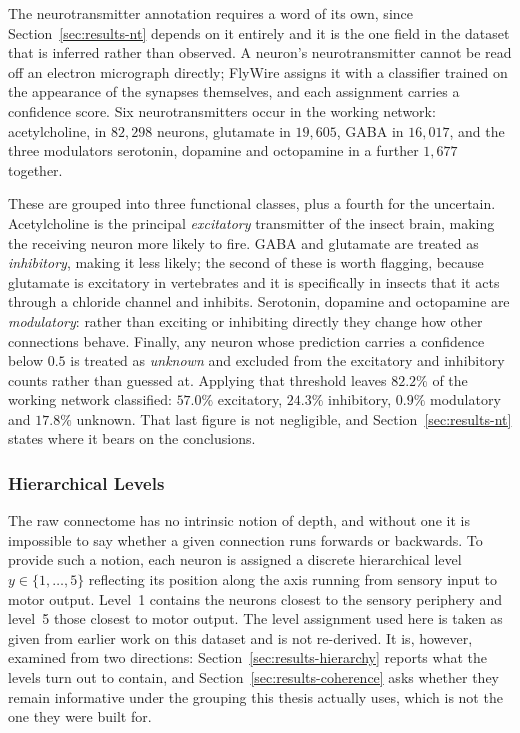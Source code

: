 \documentclass[12pt,a4paper,oneside]{article}
\theoremstyle{definition}
\theoremstyle{plain}
\begin{document}
The neurotransmitter annotation requires a word of its own, since
Section~\ref{sec:results-nt} depends on it entirely and it is the one field
in the dataset that is inferred rather than observed. A neuron's
neurotransmitter cannot be read off an electron micrograph directly; FlyWire
assigns it with a classifier trained on the appearance of the synapses
themselves, and each assignment carries a confidence score. Six
neurotransmitters occur in the working network: acetylcholine, in $82{,}298$
neurons, glutamate in $19{,}605$, GABA in $16{,}017$, and the three
modulators serotonin, dopamine and octopamine in a further $1{,}677$
together.

These are grouped into three functional classes, plus a fourth for the
uncertain. Acetylcholine is the principal \emph{excitatory} transmitter of
the insect brain, making the receiving neuron more likely to fire. GABA and
glutamate are treated as \emph{inhibitory}, making it less likely; the
second of these is worth flagging, because glutamate is excitatory in
vertebrates and it is specifically in insects that it acts through a
chloride channel and inhibits. Serotonin, dopamine and octopamine are
\emph{modulatory}: rather than exciting or inhibiting directly they change
how other connections behave. Finally, any neuron whose prediction carries a
confidence below $0.5$ is treated as \emph{unknown} and excluded from the
excitatory and inhibitory counts rather than guessed at. Applying that
threshold leaves $82.2\%$ of the working network classified: $57.0\%$
excitatory, $24.3\%$ inhibitory, $0.9\%$ modulatory and $17.8\%$ unknown.
That last figure is not negligible, and Section~\ref{sec:results-nt} states
where it bears on the conclusions.

\subsubsection{Hierarchical Levels}
\label{sec:levels}

The raw connectome has no intrinsic notion of depth, and without one it is
impossible to say whether a given connection runs forwards or backwards.
To provide such a notion, each neuron is assigned a discrete hierarchical
level $y \in \{1,\dots,5\}$ reflecting its position along the axis running
from sensory input to motor output. Level~1 contains the neurons closest to
the sensory periphery and level~5 those closest to motor output. The level
assignment used here is taken as given from earlier work on this dataset and
is not re-derived. It is, however, examined from two directions:
Section~\ref{sec:results-hierarchy} reports what the levels turn out to
contain, and Section~\ref{sec:results-coherence} asks whether they remain
informative under the grouping this thesis actually uses, which is not the
one they were built for.
\end{document}
